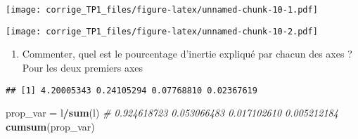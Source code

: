 \documentclass[
]{article}
\newenvironment{Shaded}{\begin{snugshade}}{\end{snugshade}}
\newcommand{\CommentTok}[1]{\textcolor[rgb]{0.56,0.35,0.01}{\textit{#1}}}
\newcommand{\DataTypeTok}[1]{\textcolor[rgb]{0.13,0.29,0.53}{#1}}
\newcommand{\KeywordTok}[1]{\textcolor[rgb]{0.13,0.29,0.53}{\textbf{#1}}}
\newcommand{\NormalTok}[1]{#1}
\newcommand{\OperatorTok}[1]{\textcolor[rgb]{0.81,0.36,0.00}{\textbf{#1}}}
\newcommand{\StringTok}[1]{\textcolor[rgb]{0.31,0.60,0.02}{#1}}
\providecommand{\tightlist}{%
  \setlength{\itemsep}{0pt}\setlength{\parskip}{0pt}}
\begin{document}
\texttt{[image: corrige\_TP1\_files/figure-latex/unnamed-chunk-10-1.pdf]}

\begin{Shaded}
\end{Shaded}

\texttt{[image: corrige\_TP1\_files/figure-latex/unnamed-chunk-10-2.pdf]}

\begin{enumerate}
\def\labelenumi{\arabic{enumi}.}
\setcounter{enumi}{17}
\tightlist
\item
  Commenter, quel est le pourcentage d'inertie expliqué par chacun des
  axes ? Pour les deux premiers axes
\end{enumerate}

\begin{Shaded}
\end{Shaded}

\begin{verbatim}
## [1] 4.20005343 0.24105294 0.07768810 0.02367619
\end{verbatim}

\begin{Shaded}
\begin{Highlighting}[]
\NormalTok{prop_var =}\StringTok{ }\NormalTok{l}\OperatorTok{/}\KeywordTok{sum}\NormalTok{(l) }\CommentTok{# 0.924618723 0.053066483 0.017102610 0.005212184}
\KeywordTok{cumsum}\NormalTok{(prop_var)}
\end{Highlighting}
\end{Shaded}
\end{document}
